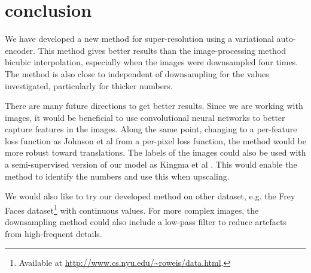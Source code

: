 \section{conclusion}
\label{sec:conclusion}

We have developed a new method for super-resolution using a variational auto-encoder.
This method gives better results than the image-processing method bicubic interpolation, especially when the images were downsampled four times.
The method is also close to independent of downsampling for the values investigated, particularly for thicker numbers.

There are many future directions to get better results.
Since we are working with images, it would be beneficial to use convolutional neural networks to better capture features in the images.
Along the same point, changing to a per-feature loss function as Johnson et al \cite{Johnson16} from a per-pixel loss function, the method would be more robust toward  translations.
The labels of the images could also be used with a semi-supervised version of our model as Kingma et al \cite{Kingma2014}. This would enable the method to identify the numbers and use this when upscaling.

We would also like to try our developed method on other dataset, e.g. the Frey Faces dataset\footnote{Available at \url{http://www.cs.nyu.edu/~roweis/data.html}.} with continuous values.
For more complex images, the downsampling method could also include a low-pass filter to reduce artefacts from high-frequent details.
